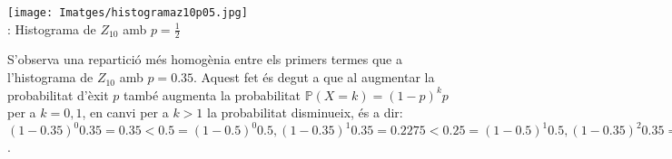 \documentclass[11pt,a4paper]{article}
\begin{document}
\begin{center}
  \texttt{[image: Imatges/histogramaz10p05.jpg]}\\
  \figurename{ : Histograma de $Z_{10}$ amb $p=\frac{1}{2}$}
\end{center}

S'observa una repartició més homogènia entre els primers termes que a l'histograma de $Z_{10}$ amb $p=0.35$. Aquest fet és degut a que al augmentar la probabilitat d'èxit $p$ també augmenta la probabilitat $\mathbb{P}(X=k)=(1-p)^{k}p$ per a $k=0,1$, en canvi per a $k>1$ la probabilitat disminueix, és a dir:
$(1-0.35)^{0}0.35=0.35<0.5=(1-0.5)^{0}0.5, (1-0.35)^{1}0.35=0.2275<0.25=(1-0.5)^{1}0.5, (1-0.35)^{2}0.35=0.147875>0.125=(1-0.5)^{2}0.5, (1-0.35)^{3}0.35=0.09611875>0.0625=(1-0.5)^{3}0.5$.
\end{document}
